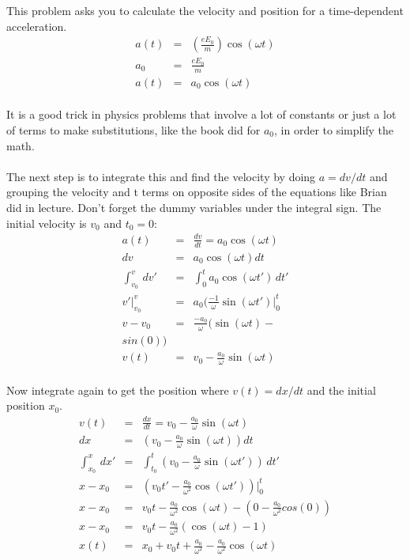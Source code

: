 \documentclass[11pt]{amsart}
\begin{document}
This problem asks you to calculate the velocity and position for a time-dependent acceleration. \\ 
\begin{eqnarray*}
a(t) &=& (\frac{eE_{0}}{m})\cos(\omega{}t) \\ 
a_{0} &=& \frac{eE_{0}}{m} \\
a(t) &=& a_{0}\cos(\omega{}t) 
\end{eqnarray*} \\
It is a good trick in physics problems that involve a lot of constants or just a lot of terms to make substitutions, like the book did for $a_{0}$, in order to simplify the math. \\ \\
The next step is to integrate this and find the velocity by doing $a=dv/dt$ and grouping the velocity and t terms on opposite sides of the equations like Brian did in lecture. Don't forget the dummy variables under the integral sign. The initial velocity is $v_{0}$ and $t_{0}=0$: \\ 
\begin{eqnarray*}
a(t) &=&\frac{dv}{dt}=a_{0}\cos(\omega{}t) \\
dv &=& a_{0}\cos(\omega{}t)dt \\
\int^{v}_{v_{0}}\,dv' &=& \int^{t}_{0}a_{0}\cos(\omega{}t')\,dt' \\
v'|^{v}_{v_{0}} &=& a_{0}(\frac{-1}{\omega}\sin(\omega{}t')|^{t}_{0} \\
v-v_{0} &=& \frac{-a_{0}}{\omega}(\sin(\omega{}t)-\\sin(0)) \\ 
v(t) &=& v_{0} -\frac{a_{0}}{\omega}\sin(\omega{}t) 
\end{eqnarray*} \\
Now integrate again to get the position where $v(t)=dx/dt$ and the initial position $x_{0}$. \\ 
\begin{eqnarray*}
v(t) &=& \frac{dx}{dt} = v_{0} -\frac{a_{0}}{\omega}\sin(\omega{}t) \\
dx &=& (v_{0} -\frac{a_{0}}{\omega}\sin(\omega{}t) )dt \\
\int^{x}_{x_{0}}\,dx' &=& \int^{t}_{t_{0}}(v_{0}-\frac{a_{0}}{\omega}\sin(\omega{}t'))\,dt' \\
x-x_{0} &=& (v_{0}t' - \frac{a_{0}}{\omega^{2}}\cos(\omega{}t'))|^{t}_{0} \\
x-x_{0} &=& v_{0}t  - \frac{a_{0}}{\omega^{2}}\cos(\omega{}t) - (0 - \frac{a_{0}}{\omega^{2}}cos(0)) \\
x-x_{0} &=& v_{0}t  - \frac{a_{0}}{\omega^{2}}(\cos(\omega{}t)-1) \\ 
x(t) &=& x_{0} + v_{0}t  + \frac{a_{0}}{\omega^{2}} -\frac{a_{0}}{\omega^{2}}\cos(\omega{}t) 
\end{eqnarray*} \\
\end{document}
